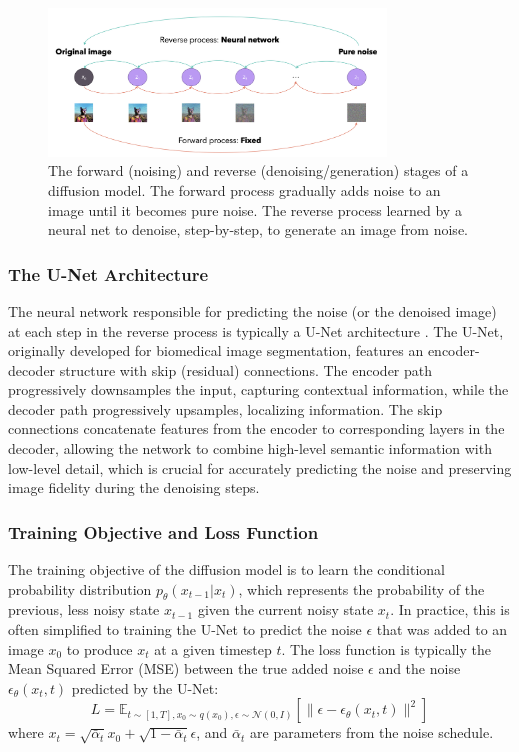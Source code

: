 \begin{figure}[h]
  \centering
  \includegraphics[width=0.8\textwidth]{images/related-work/diffusion-process.png}
  \caption{The forward (noising) and reverse (denoising/generation) stages of a diffusion model. The forward process gradually adds noise to an image until it becomes pure noise. The reverse process learned by a neural net to denoise, step-by-step, to generate an image from noise.}
  \label{fig:diffusion-process}
\end{figure}

\subsubsection{The U-Net Architecture}
The neural network responsible for predicting the noise (or the denoised image) at each step in the reverse process is typically a U-Net architecture \cite{unet}. The U-Net, originally developed for biomedical image segmentation, features an encoder-decoder structure with skip (residual) connections. The encoder path progressively downsamples the input, capturing contextual information, while the decoder path progressively upsamples, localizing information. The skip connections concatenate features from the encoder to corresponding layers in the decoder, allowing the network to combine high-level semantic information with low-level detail, which is crucial for accurately predicting the noise and preserving image fidelity during the denoising steps.

\subsubsection{Training Objective and Loss Function}
The training objective of the diffusion model is to learn the conditional probability distribution $p_\theta(x_{t-1}|x_t)$, which represents the probability of the previous, less noisy state $x_{t-1}$ given the current noisy state $x_t$. In practice, this is often simplified to training the U-Net to predict the noise $\epsilon$ that was added to an image $x_0$ to produce $x_t$ at a given timestep $t$. The loss function is typically the Mean Squared Error (MSE) between the true added noise $\epsilon$ and the noise $\epsilon_\theta(x_t, t)$ predicted by the U-Net:
\[ L = \mathbb{E}_{t \sim [1, T], x_0 \sim q(x_0), \epsilon \sim \mathcal{N}(0, I)} [\|\epsilon - \epsilon_\theta(x_t, t)\|^2] \]
where $x_t = \sqrt{\bar{\alpha}_t}x_0 + \sqrt{1-\bar{\alpha}_t}\epsilon$, and $\bar{\alpha}_t$ are parameters from the noise schedule.

